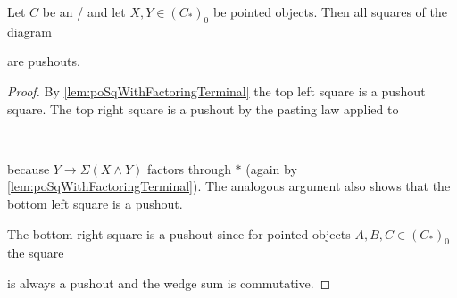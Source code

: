 \begin{lemma}\label{lem:allSqArePo}
    Let $C$ be an \inftytop/ and let $X,Y\in \left(C_*\right)_0$ be pointed objects. 
    Then all squares of the diagram         
    \begin{center}
    \end{center}
    are pushouts.
    \begin{proof}
        By \cref{lem:poSqWithFactoringTerminal} the top left square is a pushout square.
        The top right square is a pushout by the pasting law applied to
        \begin{center}
            \
        \end{center}
        because $Y\to\Sigma\left(X\wedge Y\right)$ factors through $*$ (again by \cref{lem:poSqWithFactoringTerminal}).
        The analogous argument also shows that the bottom left square is a pushout.

        The bottom right square is a pushout since for pointed objects $A,B,C\in \left(C_*\right)_0$ the square
        \begin{center}
        \end{center}
        is always a pushout and the wedge sum is commutative.
    \end{proof}
\end{lemma}
